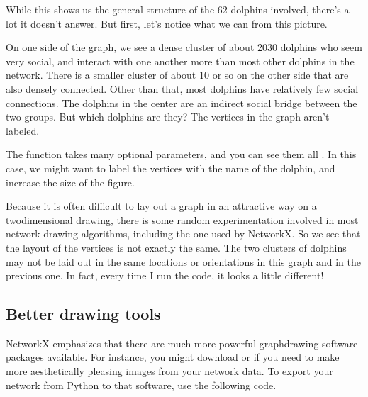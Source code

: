 \documentclass[letterpaper,10pt,english]{jupyterBook}
\begin{document}
\sphinxAtStartPar
While this shows us the general structure of the 62 dolphins involved, there’s a lot it doesn’t answer.  But first, let’s notice what we can from this picture.

\sphinxAtStartPar
On one side of the graph, we see a dense cluster of about 20\sphinxhyphen{}30 dolphins who seem very social, and interact with one another more than most other dolphins in the network.  There is a smaller cluster of about 10 or so on the other side that are also densely connected.  Other than that, most dolphins have relatively few social connections.  The dolphins in the center are an indirect social bridge between the two groups.  But which dolphins are they?  The vertices in the graph aren’t labeled.

\sphinxAtStartPar
The  function takes many optional parameters, and you can see them all .  In this case, we might want to label the vertices with the name of the dolphin, and increase the size of the figure.

\begin{sphinxVerbatim}[commandchars=\\\{\}]
    
    
\end{sphinxVerbatim}

\noindent{}

\sphinxAtStartPar
Because it is often difficult to lay out a graph in an attractive way on a two\sphinxhyphen{}dimensional drawing, there is some random experimentation involved in most network drawing algorithms, including the one used by NetworkX.  So we see that the layout of the vertices is not exactly the same.  The two clusters of dolphins may not be laid out in the same locations or orientations in this graph and in the previous one.  In fact, every time I run the code, it looks a little different!


\subsection{Better drawing tools}
\label{\detokenize{chapter-15-networks:better-drawing-tools}}
\sphinxAtStartPar
NetworkX emphasizes that there are much more powerful graph\sphinxhyphen{}drawing software packages available.  For instance, you might download  or  if you need to make more aesthetically pleasing images from your network data.  To export your network from Python to that software, use the following code.
\end{document}
